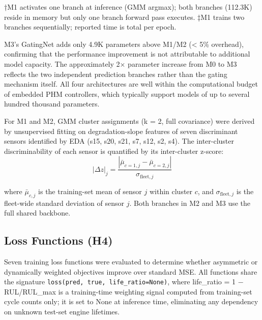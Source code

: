 \documentclass[review,12pt]{elsarticle}
\begin{document}
†M1 activates one branch at inference (GMM argmax); both branches (112.3K) reside in memory but only one branch forward pass executes.  ‡M1 trains two branches sequentially; reported time is total per epoch.

M3's GatingNet adds only 4.9K parameters above M1/M2 (< 5\% overhead), confirming that the performance improvement is not attributable to additional model capacity. The approximately 2× parameter increase from M0 to M3 reflects the two independent prediction branches rather than the gating mechanism itself. All four architectures are well within the computational budget of embedded PHM controllers, which typically support models of up to several hundred thousand parameters.

For M1 and M2, GMM cluster assignments (k = 2, full covariance) were derived by unsupervised fitting on degradation-slope features of seven discriminant sensors identified by EDA (s15, s20, s21, s7, s12, s2, s4). The inter-cluster discriminability of each sensor is quantified by its inter-cluster z-score:
\begin{equation}
|\Delta z|_j = \frac{|\bar{\mu}_{c=1,j} - \bar{\mu}_{c=2,j}|}{\sigma_{\text{fleet},j}}
\end{equation}

where $\bar{\mu}_{c,j}$ is the training-set mean of sensor $j$ within cluster $c$, and $\sigma_{\text{fleet},j}$ is the fleet-wide standard deviation of sensor $j$. Both branches in M2 and M3 use the full shared backbone.

\subsection{Loss Functions (H4)}

Seven training loss functions were evaluated to determine whether asymmetric or dynamically weighted objectives improve over standard MSE. All functions share the signature \texttt{loss(pred, true, life\_ratio=None)}, where life_ratio = 1 − RUL/RUL_max is a training-time weighting signal computed from training-set cycle counts only; it is set to None at inference time, eliminating any dependency on unknown test-set engine lifetimes.
\end{document}
